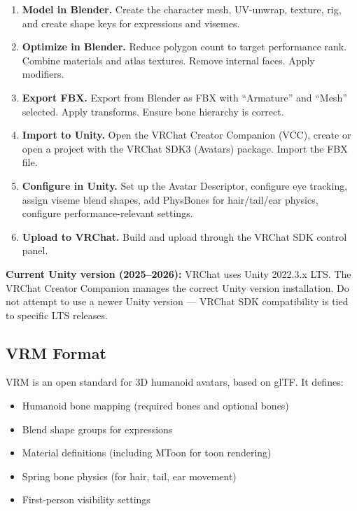 \begin{enumerate}[leftmargin=2em]
  \item \textbf{Model in Blender.} Create the character mesh, UV-unwrap, texture, rig, and create shape keys for expressions and visemes.
  \item \textbf{Optimize in Blender.} Reduce polygon count to target performance rank. Combine materials and atlas textures. Remove internal faces. Apply modifiers.
  \item \textbf{Export FBX.} Export from Blender as FBX with ``Armature'' and ``Mesh'' selected. Apply transforms. Ensure bone hierarchy is correct.
  \item \textbf{Import to Unity.} Open the VRChat Creator Companion (VCC), create or open a project with the VRChat SDK3 (Avatars) package. Import the FBX file.
  \item \textbf{Configure in Unity.} Set up the Avatar Descriptor, configure eye tracking, assign viseme blend shapes, add PhysBones for hair/tail/ear physics, configure performance-relevant settings.
  \item \textbf{Upload to VRChat.} Build and upload through the VRChat SDK control panel.
\end{enumerate}

\begin{tipbox}
\textbf{Current Unity version (2025--2026):} VRChat uses Unity 2022.3.x LTS. The VRChat Creator Companion manages the correct Unity version installation. Do not attempt to use a newer Unity version --- VRChat SDK compatibility is tied to specific LTS releases.
\end{tipbox}


\subsection{VRM Format}

VRM is an open standard for 3D humanoid avatars, based on glTF. It defines:

\begin{itemize}[leftmargin=2em]
  \item Humanoid bone mapping (required bones and optional bones)
  \item Blend shape groups for expressions
  \item Material definitions (including MToon for toon rendering)
  \item Spring bone physics (for hair, tail, ear movement)
  \item First-person visibility settings
\end{itemize}

